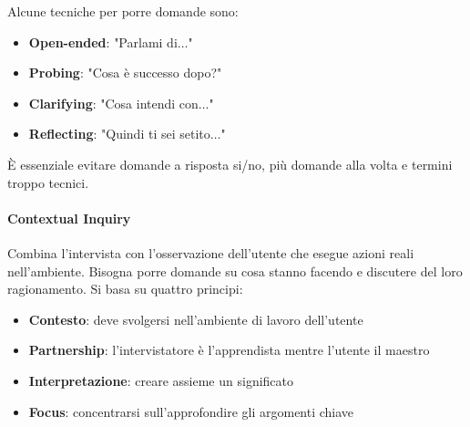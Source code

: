 \begin{observation}
	Alcune tecniche per porre domande sono:
	\begin{itemize}
		\item \textbf{Open-ended}: "Parlami di$\ldots$"
		\item \textbf{Probing}: "Cosa è successo dopo?"
		\item \textbf{Clarifying}: "Cosa intendi con$\ldots$"
		\item \textbf{Reflecting}: "Quindi ti sei setito$\ldots$"
	\end{itemize}
	È essenziale evitare domande a risposta si/no, più domande alla volta e termini troppo tecnici.
\end{observation}

\paragraph{Contextual Inquiry} Combina l'intervista con l'osservazione dell'utente che esegue azioni reali nell'ambiente. Bisogna porre domande su cosa stanno facendo e discutere del loro ragionamento. Si basa su quattro principi:
\begin{itemize}
	\item \textbf{Contesto}: deve svolgersi nell'ambiente di lavoro dell'utente
	\item \textbf{Partnership}: l'intervistatore è l'apprendista mentre l'utente il maestro
	\item \textbf{Interpretazione}: creare assieme un significato
	\item \textbf{Focus}: concentrarsi sull'approfondire gli argomenti chiave
\end{itemize}

